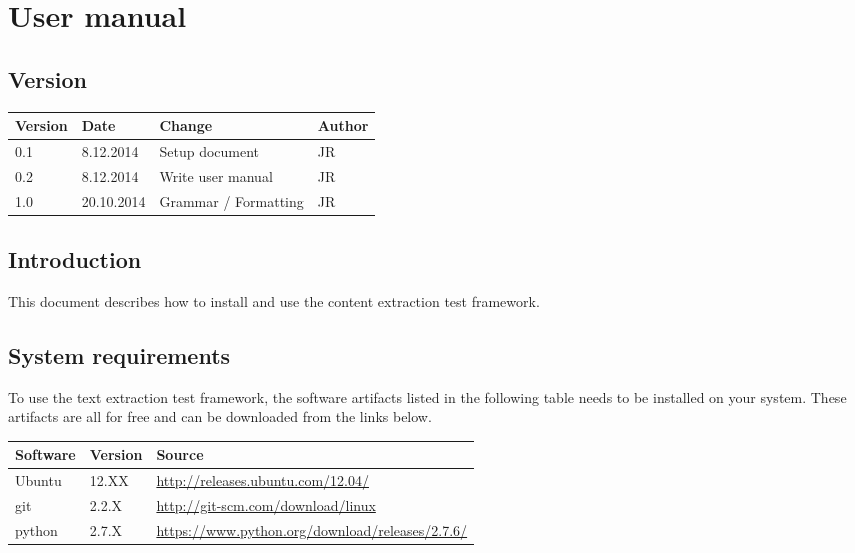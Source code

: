 
\chapter{User manual} %

\label{User manual} %



\section{Version}

\begin{tabular}{| p{1.5cm} | p{2cm} | p{9cm} | p{1.5cm} |}
    \hline
    Version & Date      & Change & Author \\ \hline
    0.1     & 8.12.2014        & Setup document                                        & JR \\ \hline
    0.2     & 8.12.2014        & Write user manual                                        & JR \\ \hline
    1.0     & 20.10.2014        & Grammar / Formatting                                       & JR \\ \hline
\end{tabular}

\section{Introduction}

This document describes how to install and use the content extraction test framework.

\section{System requirements}

To use the text extraction test framework, the software artifacts listed in the following table needs to be installed on your system. These artifacts are all for free and can be downloaded from the links below.

\begin{tabular}{| p{2cm} | p{1.5cm} | p{9.5cm} |} 
	\hline
	\textbf{Software} & \textbf{Version} & \textbf{Source} \\ \hline
	Ubuntu & 12.XX & \url{http://releases.ubuntu.com/12.04/} \\ \hline
	git & 2.2.X & \url{http://git-scm.com/download/linux} \\ \hline
	python & 2.7.X & \url{https://www.python.org/download/releases/2.7.6/} \\ \hline
\end{tabular}



